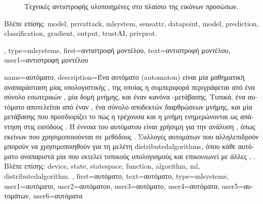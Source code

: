 {{\begin{figure}[H]
\begin{center}
			\end{center} 
		{
		\caption{\foreignlanguage{greek}{Τεχνικές αντιστροφής}  \foreignlanguage{greek}{υλοποιημένες στο πλαίσιο της} 
			 \foreignlanguage{greek}{εικόνων προσώπων}. \label{fig_model_inv_dict}} }
		\end{figure}
  		\foreignlanguage{greek}{Βλέπε επίσης:} \gls{model}, \gls{privattack}, \gls{mlsystem}, \gls{sensattr}, \gls{datapoint}, \gls{model}, \gls{prediction}, 
		\gls{classification}, \gls{gradient}, \gls{output}, \gls{trustAI}, \gls{privprot}. },
	type=mlsystems,
 	first={\foreignlanguage{greek}{αντιστροφή μοντέλου}},
  	text={\foreignlanguage{greek}{αντιστροφή μοντέλου}},
	user1={\foreignlanguage{greek}{αντιστροφή μοντέλου}} %
}

{name={\foreignlanguage{greek}{αυτόματο}},
	description={\foreignlanguage{greek}{Ένα αυτόματο} (automaton) 
		\foreignlanguage{greek}{είναι μία μαθηματική αναπαράσταση μίας υπολογιστικής} , 
		\foreignlanguage{greek}{της οποίας η συμπεριφορά περιγράφεται από ένα σύνολο εσωτερικών} 
		, \foreignlanguage{greek}{μία δομή μνήμης, και έναν κανόνα} 
		-\foreignlanguage{greek}{μετάβασης. Τυπικά, ένα αυτόματο αποτελείται από έναν} 
		, \foreignlanguage{greek}{ένα σύνολο αποδεκτών διαρθρώσεων μνήμης, 
		και μία}  \foreignlanguage{greek}{μετάβασης που προσδιορίζει το πώς η τρέχουσα} 
		 \foreignlanguage{greek}{και η μνήμη ενημερώνονται ως απάντηση στις εισόδους}
		\cite{Sipser2013}. \foreignlanguage{greek}{Η έννοια του αυτόματου είναι χρήσιμη για την ανάλυση}
		, \foreignlanguage{greek}{όπως εκείνων που χρησιμοποιούνται σε μεθόδους} 
		 \cite{Cormen:2022aa}. \foreignlanguage{greek}{Συλλογές αυτομάτων που αλληλεπιδρούν 
		μπορούν να χρησιμοποιηθούν για τη μελέτη} \glspl{distributedalgorithm}, 
		\foreignlanguage{greek}{όπου κάθε αυτόματο αναπαριστά μία}  \foreignlanguage{greek}{που 
		εκτελεί τοπικούς υπολογισμούς και επικοινωνεί με άλλες}  
		\cite{ParallelDistrBook}, \cite{LynchDistributedAlgorithms}.
		\\
		\foreignlanguage{greek}{Βλέπε επίσης:} \gls{device}, \gls{state}, \gls{statespace}, \gls{function}, 
		\gls{algorithm}, \gls{ml}, \gls{distributedalgorithm}. }, 
	first={\foreignlanguage{greek}{αυτόματο}},
	text={\foreignlanguage{greek}{αυτόματο}},
	type=mlsystems,
	user1={\foreignlanguage{greek}{αυτόματο}}, %
	user2={\foreignlanguage{greek}{αυτόματου}}, %
	user3={\foreignlanguage{greek}{αυτόματο}}, %
	user4={\foreignlanguage{greek}{αυτόματα}}, %
	user5={\foreignlanguage{greek}{αυτομάτων}}, %
	user6={\foreignlanguage{greek}{αυτόματα}} %
}

